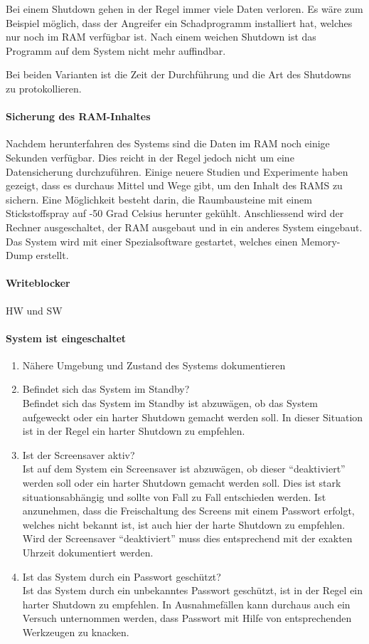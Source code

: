 Bei einem Shutdown gehen in der Regel immer viele Daten verloren. Es wäre zum Beispiel möglich, dass der Angreifer ein Schadprogramm installiert hat, welches nur noch im RAM verfügbar ist. Nach einem weichen Shutdown ist das Programm auf dem System nicht mehr auffindbar. 

Bei beiden Varianten ist die Zeit der Durchführung und die Art des Shutdowns zu protokollieren.

\paragraph{Sicherung des RAM-Inhaltes}
Nachdem herunterfahren des Systems sind die Daten im RAM noch einige Sekunden verfügbar. Dies reicht in der Regel jedoch nicht um eine Datensicherung durchzuführen. Einige neuere Studien und Experimente haben gezeigt, dass es durchaus Mittel und Wege gibt, um den Inhalt des RAMS zu sichern. Eine Möglichkeit besteht darin, die Raumbausteine mit einem Stickstoffspray auf -50 Grad Celsius herunter gekühlt. Anschliessend wird der Rechner ausgeschaltet, der RAM ausgebaut und in ein anderes System eingebaut. Das System wird mit einer Spezialsoftware gestartet, welches einen Memory-Dump erstellt.

\paragraph{Writeblocker}
HW und SW

\paragraph{System ist eingeschaltet}
\begin{enumerate}
\item Nähere Umgebung und Zustand des Systems dokumentieren
\item Befindet sich das System im Standby? \\
Befindet sich das System im Standby ist abzuwägen, ob das System aufgeweckt oder ein harter Shutdown gemacht werden soll. In dieser Situation ist in der Regel ein harter Shutdown  zu empfehlen.
\item Ist der Screensaver aktiv? \\
Ist auf dem System ein Screensaver ist abzuwägen, ob dieser "`deaktiviert"' werden soll oder ein harter Shutdown gemacht werden soll. Dies ist stark situationsabhängig und sollte von Fall zu Fall entschieden werden. Ist anzunehmen, dass die Freischaltung des Screens mit einem Passwort erfolgt, welches nicht bekannt ist, ist auch hier der harte Shutdown zu empfehlen. Wird der Screensaver "`deaktiviert"' muss dies entsprechend mit der exakten Uhrzeit dokumentiert werden.
\item Ist das System durch ein Passwort geschützt? \\
Ist das System durch ein unbekanntes Passwort geschützt, ist in der Regel ein harter Shutdown zu empfehlen. In Ausnahmefällen kann durchaus auch ein Versuch unternommen werden, dass Passwort mit Hilfe von entsprechenden Werkzeugen zu knacken.
\end{enumerate}

